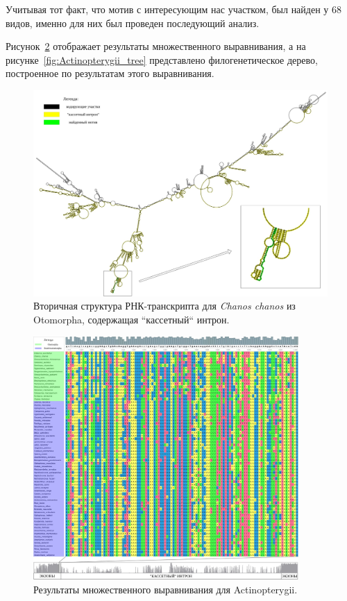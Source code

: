 Учитывая тот факт, что мотив с интересующим нас участком, был найден у 68 видов, именно для них был проведен последующий анализ.

Рисунок~\ref{fig:Actinopterygii_alignment_ruler} отображает результаты множественного выравнивания, а на рисунке~\ref{fig:Actinopterygii_tree} представлено филогенетическое дерево, построенное по результатам этого выравнивания.

\begin{figure}
    \centering
    \includegraphics[width=0.9\textheight]{images/Chanos_chanos_2nd_structure}
    \caption{Вторичная структура РНК-транскрипта для \textit{Chanos chanos} из Otomorpha, содержащая ``кассетный`` интрон.}
    \label{fig:Chanos_chanos_2nd_structure}
\end{figure}

\begin{figure}[ht] %
    \centering
    \includegraphics[width=0.9\textwidth]{images/Actinopterygii_alignment_ruler}
    \caption{Результаты множественного выравнивания для Actinopterygii.}
    \label{fig:Actinopterygii_alignment_ruler}
\end{figure}

